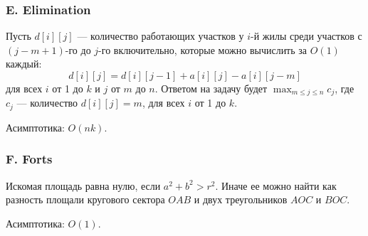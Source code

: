 \subsubsection*{E. Elimination}


Пусть $d[i][j]$ --- количество работающих участков у $i$-й жилы среди участков с $(j-m+1)$-го до $j$-го включительно, которые можно вычислить за $O(1)$ каждый:$$d[i][j] = d[i][j-1] + a[i][j] - a[i][j-m]$$
для всех $i$ от 1 до $k$ и $j$ от $m$ до $n$.
Ответом на задачу будет $\max_{m\leqslant j \leqslant n} c_j$,
где $c_j$ --- количество $d[i][j] = m$, для всех $i$ от 1 до $k$.

Асимптотика: $O(n k)$.



\subsubsection*{F. Forts}


\begin{center}
\end{center}

Искомая площадь равна нулю, если $a^2 + b^2 > r^2$. Иначе ее можно найти как разность площали кругового сектора $OAB$ и двух треугольников $AOC$ и $BOC$.

Асимптотика: $O(1)$.